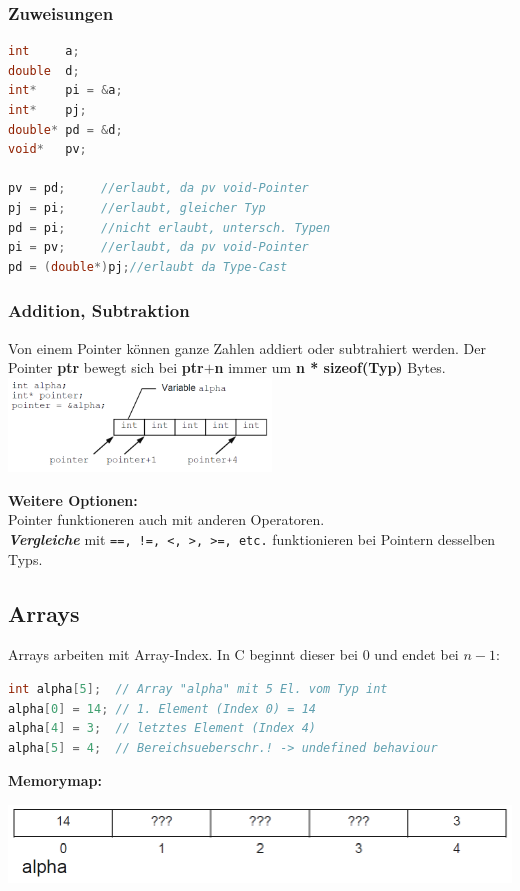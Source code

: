 
		\subsubsection{Zuweisungen}
			\begin{lstlisting}[language=C]
int     a;
double  d;
int*    pi = &a;
int*    pj;
double* pd = &d;
void*   pv; 

pv = pd;	 //erlaubt, da pv void-Pointer
pj = pi;	 //erlaubt, gleicher Typ
pd = pi;	 //nicht erlaubt, untersch. Typen
pi = pv;	 //erlaubt, da pv void-Pointer
pd = (double*)pj;//erlaubt da Type-Cast
			\end{lstlisting}
		
		\subsubsection{Addition, Subtraktion}
			Von einem Pointer können ganze Zahlen addiert oder subtrahiert werden. Der Pointer \textbf{ptr} bewegt sich bei \textbf{ptr$+$n} immer um \textbf{n * sizeof(Typ)} Bytes. \\
			\includegraphics[height=2.5cm]{Bilder/ptr_add-subtraction.png}

			\textbf{Weitere Optionen:}\\
				Pointer funktioneren auch mit anderen Operatoren.\\
				\textbf{\textit{Vergleiche}} mit \verb|==, !=, <, >, >=, etc.| funktionieren bei Pointern desselben Typs.

	\subsection{Arrays}
			Arrays arbeiten mit Array-Index. In C beginnt dieser bei 0 und endet bei $n-1$:
			\begin{lstlisting}[language=C]
int alpha[5];  // Array "alpha" mit 5 El. vom Typ int
alpha[0] = 14; // 1. Element (Index 0) = 14
alpha[4] = 3;  // letztes Element (Index 4)
alpha[5] = 4;  // Bereichsueberschr.! -> undefined behaviour
			\end{lstlisting}
			\textbf{Memorymap:}\\
				\begin{minipage}{1\linewidth}
					\includegraphics[width=0.5\linewidth]{Bilder/arr-mem-map.png}
				\end{minipage}

